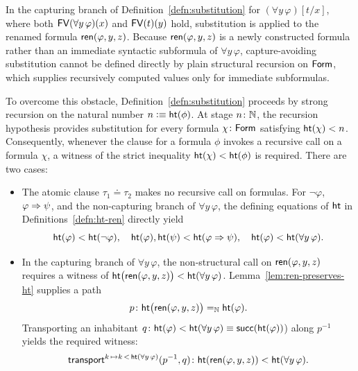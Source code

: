 \begin{rem}\label{rem:substitution-strong-recursion}
    In the capturing branch of Definition~\ref{defn:substitution} for $(\forall y\,\varphi)[t/x]$, where both $\mathsf{FV}(\forall y\,\varphi)(x)$ and $\mathsf{FV}(t)(y)$ hold, substitution is applied to the renamed formula $\mathsf{ren}(\varphi,y,z)$. Because $\mathsf{ren}(\varphi,y,z)$ is a newly constructed formula rather than an immediate syntactic subformula of $\forall y\,\varphi$, capture-avoiding substitution cannot be defined directly by plain structural recursion on $\mathsf{Form}$, which supplies recursively computed values only for immediate subformulas.
    
    To overcome this obstacle, Definition~\ref{defn:substitution} proceeds by strong recursion on the natural number $n\mathrel{\vcentcolon}\equiv\mathsf{ht}(\phi)$. At stage $n\colon\N$, the recursion hypothesis provides substitution for every formula $\chi\colon\fun{Form}$ satisfying $\mathsf{ht}(\chi)<n$. Consequently, whenever the clause for a formula $\phi$ invokes a recursive call on a formula $\chi$, a witness of the strict inequality $\mathsf{ht}(\chi)<\mathsf{ht}(\phi)$ is required. There are two cases:
    \begin{itemize}
        \item The atomic clause $\tau_1\doteq\tau_2$ makes no recursive call on formulas. For $\neg\varphi$, $\varphi\mathrel{\Rightarrow}\psi$, and the non-capturing branch of $\forall y\,\varphi$, the defining equations of $\mathsf{ht}$ in Definitions~\ref{defn:ht-ren} directly yield
        \[
            \mathsf{ht}(\varphi)
            <
            \mathsf{ht}(\neg\varphi),
            \quad
            \mathsf{ht}(\varphi),\mathsf{ht}(\psi)
            <
            \mathsf{ht}(\varphi\mathrel{\Rightarrow}\psi),
            \quad
            \mathsf{ht}(\varphi)
            <
            \mathsf{ht}(\forall y\,\varphi).
        \]
        
        \item In the capturing branch of $\forall y\,\varphi$, the non-structural call on $\mathsf{ren}(\varphi,y,z)$ requires a witness of $\mathsf{ht}\bigl(\mathsf{ren}(\varphi,y,z)\bigr)<\mathsf{ht}(\forall y\,\varphi)$. Lemma~\ref{lem:ren-preserves-ht} supplies a path
        \[
            p\colon\fun{ht}\bigl(
            \fun{ren}(\varphi,y,z)
            \bigr)
            \eq\N
            \fun{ht}(\varphi).
        \]
        Transporting an inhabitant $q\colon\fun{ht}(\varphi)<\fun{ht}(\forall y\,\varphi)\equiv\fun{succ}(\fun{ht}(\varphi))$) along $p^{-1}$ yields the required witness:
        \[
            \fun{transport}^{
                k\,\mapsto k\,<\,\fun{ht}(\forall y\,\varphi)
            }(p^{-1},q)
            \colon
                \fun{ht}(\fun{ren}(\varphi,y,z))
                <
                \fun{ht}(\forall y\,\varphi).
        \]
    \end{itemize}
\end{rem}

